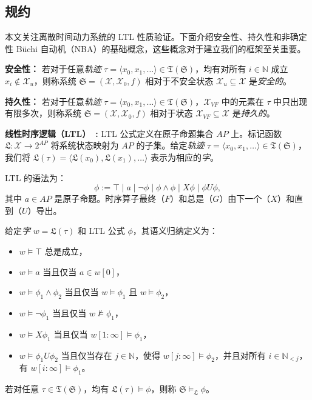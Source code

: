\subsection{规约}
\label{specification123}
本文关注离散时间动力系统的 LTL 性质验证。下面介绍安全性、持久性和非确定性 Büchi 自动机（NBA）的基础概念，这些概念对于建立我们的框架至关重要。

\textbf{安全性：} 若对于任意\emph{轨迹} $\tau = \langle x_0, x_1, \dots \rangle \in \mathfrak{T}(\mathfrak{S})$，均有对所有 $i \in \mathbb{N}$ 成立 $x_i \not\in \mathcal{X}_u$，则称系统 $\mathfrak{S}=(\mathcal{X}, \mathcal{X}_0, f)$ 相对于不安全状态 $\mathcal{X}_u \subseteq \mathcal{X}$ 是\emph{安全的}。

\textbf{持久性：} 若对于任意\emph{轨迹} $\tau = \langle x_0, x_1, \dots \rangle \in \mathfrak{T}(\mathfrak{S})$，$\mathcal{X}_{VF}$ 中的元素在 $\tau$ 中只出现有限多次，则称系统 $\mathfrak{S}=(\mathcal{X}, \mathcal{X}_0, f)$ 相对于状态 $\mathcal{X}_{VF} \subseteq \mathcal{X}$ 是\emph{持久的}。

\textbf{线性时序逻辑（LTL）~\cite{pnueli1977temporal}:} LTL 公式定义在原子命题集合 $AP$ 上。标记函数 $\mathfrak{L}: \mathcal{X} \rightarrow 2^{AP}$ 将系统状态映射为 $AP$ 的子集。给定\emph{轨迹} $\tau = \langle x_0, x_1, \dots \rangle \in \mathfrak{T}(\mathfrak{S})$，我们将 $\mathfrak{L}(\tau) = \langle \mathfrak{L}(x_0), \mathfrak{L}(x_1), \dots \rangle$ 表示为相应的\emph{字}。

LTL 的语法为：
\[
\phi := \top \mid a \mid \lnot \phi \mid \phi \land \phi \mid X \phi \mid \phi U \phi,
\]
其中 $a \in AP$ 是原子命题。时序算子最终（$F$）和总是（$G$）由下一个（$X$）和直到（$U$）导出。

给定\emph{字} $w = \mathfrak{L}(\tau)$ 和 LTL 公式 $\phi$，其语义归纳定义为：
\begin{itemize}
    \item \(w \models \top \) 总是成立，
    \item \(w \models a\) 当且仅当 \(a \in w[0]\)，
    \item \(w \models \phi_1 \land \phi_2\) 当且仅当 \(w \models \phi_1\) 且 \(w \models \phi_2\)，
    \item \(w \models \lnot \phi_1\) 当且仅当 \(w \not\models \phi_1\)，
    \item \(w \models X \phi_1\) 当且仅当 \(w[1:\infty] \models \phi_1\)，
    \item \(w \models \phi_1 U \phi_2\) 当且仅当存在 \(j \in \mathbb{N}\)，使得 \(w[j:\infty] \models \phi_2\)，并且对所有 \(i \in \mathbb{N}_{<j}\)，有 \(w[i:\infty] \models \phi_1\)。
\end{itemize}
若对任意 $\tau \in \mathfrak{T}(\mathfrak{S})$，均有 $\mathfrak{L}(\tau) \models \phi$，则称 $\mathfrak{S} \models_{\mathfrak{L}} \phi$。

